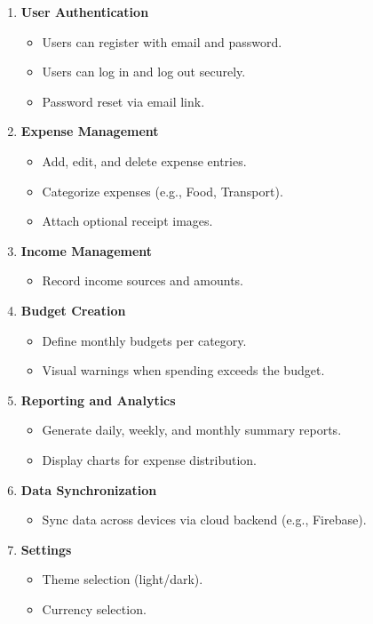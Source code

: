 \documentclass[12pt,a4paper]{article}
\begin{document}
\begin{enumerate}[label=\textbf{FR\arabic*:}, leftmargin=*, itemsep=0.5em]

  \item \textbf{User Authentication}
        \begin{itemize}
            \item Users can register with email and password.
            \item Users can log in and log out securely.
            \item Password reset via email link.
        \end{itemize}

  \item \textbf{Expense Management}
        \begin{itemize}
            \item Add, edit, and delete expense entries.
            \item Categorize expenses (e.g., Food, Transport).
            \item Attach optional receipt images.
        \end{itemize}

  \item \textbf{Income Management}
        \begin{itemize}
            \item Record income sources and amounts.
        \end{itemize}

  \item \textbf{Budget Creation}
        \begin{itemize}
            \item Define monthly budgets per category.
            \item Visual warnings when spending exceeds the budget.
        \end{itemize}

  \item \textbf{Reporting and Analytics}
        \begin{itemize}
            \item Generate daily, weekly, and monthly summary reports.
            \item Display charts for expense distribution.
        \end{itemize}

  \item \textbf{Data Synchronization}
        \begin{itemize}
            \item Sync data across devices via cloud backend (e.g., Firebase).
        \end{itemize}

  \item \textbf{Settings}
        \begin{itemize}
            \item Theme selection (light/dark).
            \item Currency selection.
        \end{itemize}

\end{enumerate}
\end{document}

